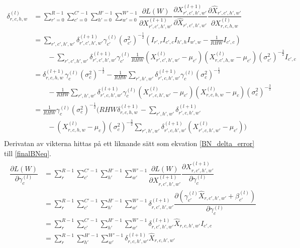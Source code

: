 \documentclass[a4paper,11pt,twoside]{article}
\newcommand*{\pd}[2]{\ensuremath{\dfrac{\partial #1}{\partial #2}}}
\begin{document}
\begin{equation}\label{finalBNeq}
\begin{split}
	\delta^{(l)}_{r,c,h,w} 
	& = \sum^{R-1}_{r'=0} \sum^{C'-1}_{c'=0} \sum^{H'-1}_{h'=0} \sum^{W'-1}_{w'=0} \pd{L(W)}{X^{(l+1)}_{r',c',h',w'}} \pd{X^{(l+1)}_{r',c',h',w'}}{\hat{X}_{r',c',h',w'}} \pd{\hat{X}_{r',c',h',w'}}{{X}^{(l)}_{r,c,h,w}}\\
	& = \sum\limits_{r',c',h',w'}\delta^{(l+1)}_{r',c',h',w'} \gamma^{(l)}_{c'} {(\sigma^2_{c'})}^{-\frac{1}{2}} (I_{r',r} I_{c',c} I_{h',h} I_{w',w} - \frac{1}{RHW} I_{c',c}) \\
	& \qquad -\sum\limits_{r',c',h',w'}\delta^{(l+1)}_{r',c',h',w'} \gamma^{(l)}_{c'} \frac{1}{RHW} ({X^{(l)}_{r',c',h',w'} - \mu_{c'}})({X^{(l)}_{r,c',h,w} - \mu_{c'}}) {(\sigma^2_{c'})}^{-\frac{3}{2}} I_{c',c} \\
	& = \delta^{(l+1)}_{r,c,h,w} \gamma^{(l)}_{c} {(\sigma^2_{c})}^{-\frac{1}{2}} - \frac{1}{RHW} \sum\limits_{r',h',w'} \delta^{(l+1)}_{r',c,h',w'} \gamma^{(l)}_{c} {(\sigma^2_{c})}^{-\frac{1}{2}}\\
	& \qquad - \frac{1}{RHW} \sum\limits_{r',h',w'} \delta^{(l+1)}_{r',c,h',w'}\gamma^{(l)}_{c} ({X^{(l)}_{r',c,h',w'} - \mu_{c'}})({X^{(l)}_{r,c,h,w} - \mu_{c}}){(\sigma^2_{c})}^{-\frac{3}{2}} \\
	& = \frac{1}{RHW} \gamma^{(l)}_c {(\sigma^2_{c})}^{-\frac{1}{2}} \biggl(    RHW \delta^{(l+1)}_{r,c,h,w} -  \sum\limits_{r',h',w'} \delta^{(l+1)}_{r',c,h',w'} \qquad \\
	& \qquad -  ({X^{(l)}_{r,c,h,w} - \mu_{c}}) {(\sigma^2_{c})}^{-\frac{3}{2}} \sum\limits_{r',h',w'} \delta^{(l+1)}_{r',c,h',w'} ({X^{(l)}_{r',c,h',w'} - \mu_{c'}}) \biggl) \\
\end{split}
\end{equation}
Derivatan av vikterna hittas på ett liknande sätt som ekvation \eqref{BN_delta_error} till \eqref{finalBNeq}. \cite{webBN1} \cite{webBN2}
\begin{align}
\begin{split}
	\pd{L(W)}{\gamma^{(l)}_{c}}
		& = \sum^{R-1}_{r} \sum^{C'-1}_{c'} \sum^{H'-1}_{h'} \sum^{W'-1}_{w'} \pd{L(W)}{X^{(l+1)}_{r,c',h',w'}} \pd{X^{(l+1)}_{r,c',h',w'}}{\gamma^{(l)}_{c}} \\
		& = \sum^{R-1}_{r} \sum^{C'-1}_{c'} \sum^{H'-1}_{h'} \sum^{W'-1}_{w'} \delta^{(l+1)}_{r,c',h',w'}  \pd{({\gamma_{c'}^{(l)} \hat{X}_{r,c',h',w'} + \beta_{c'}^{(l)}})}{\gamma^{(l)}_{c}} \\
		& = \sum^{R-1}_{r} \sum^{C'-1}_{c'} \sum^{H'-1}_{h'} \sum^{W'-1}_{w'} \delta^{(l+1)}_{r,c',h',w'} \hat{X}_{r,c,h',w'} I_{c',c}\\
		& = \sum^{R-1}_{r} \sum^{H'-1}_{h'} \sum^{W'-1}_{w'} \delta^{(l+1)}_{r,c,h',w'} \hat{X}_{r,c,h',w'} \\
\end{split}
\end{align}
\end{document}
